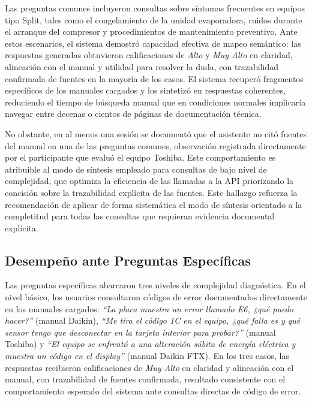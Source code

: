 {{Las preguntas comunes incluyeron consultas sobre síntomas frecuentes en equipos tipo Split, tales como el congelamiento de la unidad evaporadora, ruidos durante el arranque del compresor y procedimientos de mantenimiento preventivo. Ante estos escenarios, el sistema demostró capacidad efectiva de mapeo semántico: las respuestas generadas obtuvieron calificaciones de \textit{Alto} y \textit{Muy Alto} en claridad, alineación con el manual y utilidad para resolver la duda, con trazabilidad confirmada de fuentes en la mayoría de los casos. El sistema recuperó fragmentos específicos de los manuales cargados y los sintetizó en respuestas coherentes, reduciendo el tiempo de búsqueda manual que en condiciones normales implicaría navegar entre decenas o cientos de páginas de documentación técnica.

No obstante, en al menos una sesión se documentó que el asistente no citó fuentes del manual en una de las preguntas comunes, observación registrada directamente por el participante que evaluó el equipo Toshiba. Este comportamiento es atribuible al modo de síntesis empleado para consultas de bajo nivel de complejidad, que optimiza la eficiencia de las llamadas a la API priorizando la concisión sobre la trazabilidad explícita de las fuentes. Este hallazgo refuerza la recomendación de aplicar de forma sistemática el modo de síntesis orientado a la completitud para todas las consultas que requieran evidencia documental explícita.

\subsection{Desempeño ante Preguntas Específicas}

Las preguntas específicas abarcaron tres niveles de complejidad diagnóstica. En el nivel básico, los usuarios consultaron códigos de error documentados directamente en los manuales cargados: \textit{``La placa muestra un error llamado E6, ¿qué puedo hacer?''} (manual Daikin), \textit{``Me tira el código 1C en el equipo, ¿qué falla es y qué sensor tengo que desconectar en la tarjeta interior para probar?''} (manual Toshiba) y \textit{``El equipo se enfrentó a una alteración súbita de energía eléctrica y muestra un código en el display''} (manual Daikin FTX). En los tres casos, las respuestas recibieron calificaciones de \textit{Muy Alto} en claridad y alineación con el manual, con trazabilidad de fuentes confirmada, resultado consistente con el comportamiento esperado del sistema ante consultas directas de código de error.

}}
